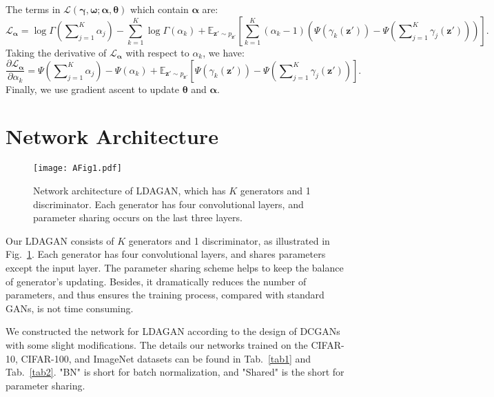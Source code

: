 \documentclass{article}
\begin{document}
The terms in $\mathcal{L}\left( \bm{\gamma},\bm{\omega}; \bm{\alpha},\bm{\theta}\right)$ which contain $\bm{\alpha}$ are:
\begin{equation}
\label{eq:Appendix21}
\mathcal{L}_{\bm{\alpha}}
=
\log \Gamma \left( \sum\nolimits_{j=1}^K \alpha_j \right)
-\sum_{k=1}^K \log \Gamma \left( \alpha_k \right)
+
\mathbb{E}_{\mathbf{z}' \sim p_{\mathbf{z}'}}
\left[
\sum_{k=1}^K
\left( \alpha_k-1 \right)
\left( \Psi\left(\gamma_k\left(\mathbf{z}'\right)\right)
-\Psi\left(\sum\nolimits_{j=1}^K\gamma_j\left(\mathbf{z}'\right)\right) \right)
\right].
\end{equation}
Taking the derivative of $\mathcal{L}_{\bm{\alpha}}$ with respect to $\alpha_k$, we have:
\begin{equation}
\label{eq:Appendix22}
\frac{\partial \mathcal{L}_{\bm{\alpha}}}
{\partial \alpha_k}
=
\Psi\left(\sum\nolimits_{j=1}^K\alpha_j\right)-\Psi\left(\alpha_k\right)
+
\mathbb{E}_{\mathbf{z}' \sim p_{\mathbf{z}'}}
\left[
\Psi\left( \gamma_k\left( \mathbf{z}' \right) \right)
-\Psi\left( \sum\nolimits_{j=1}^K \gamma_j\left( \mathbf{z}' \right) \right)
\right].
\end{equation}
Finally, we use gradient ascent to update $\bm{\theta}$ and $\bm{\alpha}$.


\section{Network Architecture}
\label{App:NetArch}

\begin{figure}
  \centering
    \texttt{[image: AFig1.pdf]}
     \caption{Network architecture of LDAGAN, which has $K$ generators and 1 discriminator. Each generator has four convolutional layers, and parameter sharing occurs on the last three layers.}
     \label{fig:Synth}
\end{figure}

Our LDAGAN consists of $K$ generators and 1 discriminator, as illustrated in Fig.~\ref{fig:Synth}.
Each generator has four convolutional layers, and shares parameters except the input layer.
The parameter sharing scheme helps to keep the balance of generator's updating.
Besides, it dramatically reduces the number of parameters, and thus ensures the training process, compared with standard GANs, is not time consuming.


We constructed the network for LDAGAN according to the design of DCGANs~\cite{radford2015unsupervised} with some slight modifications.
The details our networks trained on the CIFAR-10, CIFAR-100, and ImageNet datasets can be found in Tab.~\ref{tab1} and Tab.~\ref{tab2}.
"BN" is short for batch normalization, and "Shared" is the short for parameter sharing.
\end{document}
